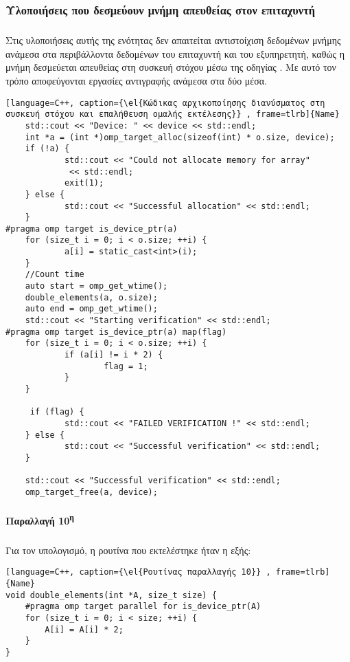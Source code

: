 \newpage
\clearpage
\subsubsection{Υλοποιήσεις που δεσμεύουν μνήμη απευθείας στον επιταχυντή}
\subparagraph{}
Στις υλοποιήσεις αυτής της ενότητας δεν απαιτείται αντιστοίχιση δεδομένων μνήμης ανάμεσα στα περιβάλλοντα δεδομένων του επιταχυντή και του εξυπηρετητή, καθώς η μνήμη δεσμεύεται απευθείας στη συσκευή στόχου μέσω της οδηγίας \emph{}. Με αυτό τον τρόπο αποφεύγονται εργασίες αντιγραφής ανάμεσα στα δύο μέσα.
\ \\
\begin{lstlisting}[language=C++, caption={\el{Κώδικας αρχικοποίησης διανύσματος στη συσκευή στόχου και επαλήθευση ομαλής εκτέλεσης}} , frame=tlrb]{Name}
    std::cout << "Device: " << device << std::endl;
    int *a = (int *)omp_target_alloc(sizeof(int) * o.size, device);
    if (!a) {
            std::cout << "Could not allocate memory for array"
             << std::endl;
            exit(1);
    } else {
            std::cout << "Successful allocation" << std::endl;
    }
#pragma omp target is_device_ptr(a)
    for (size_t i = 0; i < o.size; ++i) {
            a[i] = static_cast<int>(i);
    }
    //Count time
    auto start = omp_get_wtime();
    double_elements(a, o.size);
    auto end = omp_get_wtime();
    std::cout << "Starting verification" << std::endl;
#pragma omp target is_device_ptr(a) map(flag)
    for (size_t i = 0; i < o.size; ++i) {
            if (a[i] != i * 2) {
                    flag = 1;
            }
    }
    
     if (flag) {
            std::cout << "FAILED VERIFICATION !" << std::endl;
    } else {
            std::cout << "Successful verification" << std::endl;
    }

    std::cout << "Successful verification" << std::endl;
    omp_target_free(a, device);
\end{lstlisting}

\clearpage
\paragraph{Παραλλαγή 10\textsuperscript{η}}
\subparagraph{}
Για τον υπολογισμό, η ρουτίνα που εκτελέστηκε ήταν η εξής:

\begin{lstlisting}[language=C++, caption={\el{Ρουτίνας παραλλαγής 10}} , frame=tlrb]{Name}
void double_elements(int *A, size_t size) {
	#pragma omp target parallel for is_device_ptr(A)
	for (size_t i = 0; i < size; ++i) {
		A[i] = A[i] * 2;
	}
}
\end{lstlisting}

